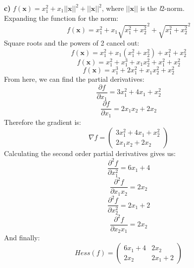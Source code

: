 \documentclass{article}
\begin{document}
\textbf{c)} $f(\boldsymbol{x}) = x_1^2 + x_1||\boldsymbol{x}||^2 + ||\boldsymbol{x}||^2$, where $||\boldsymbol{x}||$ is the \textit{l}2-norm.\\
Expanding the function for the norm:
\begin{equation*}
    f(\boldsymbol{x}) = x_1^2 + x_1 \sqrt{x_1^2 + x_2^2}^2 + \sqrt{x_1^2 + x_2^2}^2
\end{equation*}
Square roots and the powers of 2 cancel out:
\begin{equation*}
    f(\boldsymbol{x}) = x_1^2 + x_1(x_1^2 + x_2^2) + x_1^2 + x_2^2
\end{equation*}
\begin{equation*}
    f(\boldsymbol{x}) = x_1^2 + x_1^3 + x_1x_2^2 + x_1^2 + x_2^2
\end{equation*}
\begin{equation*}
    f(\boldsymbol{x}) = x_1^3 + 2x_1^2 + x_1x_2^2 + x_2^2
\end{equation*}
From here, we can find the partial derivatives:
\begin{equation*}
    \frac{\partial f}{\partial x_1} = 3x_1^2 + 4x_1 + x_2^2
\end{equation*}
\begin{equation*}
    \frac{\partial f}{\partial x_1} = 2x_1x_2 + 2x_2
\end{equation*}
Therefore the gradient is:
\begin{equation*}
    \nabla f = \begin{pmatrix} 3x_1^2 + 4x_1 + x_2^2\\ 2x_1x_2 + 2x_2\end{pmatrix}
\end{equation*}
Calculating the second order partial derivatives gives us:
\begin{equation*}
    \frac{\partial ^2 f}{\partial x_1^2} = 6x_1 + 4
\end{equation*}
\begin{equation*}
    \frac{\partial ^2 f}{\partial x_1x_2} = 2x_2
\end{equation*}
\begin{equation*}
    \frac{\partial ^2 f}{\partial x_2^2} = 2x_1 + 2
\end{equation*}
\begin{equation*}
    \frac{\partial ^2 f}{\partial x_2x_1} = 2x_2
\end{equation*}
And finally:
\begin{equation}
\label{1c_hess}
    Hess(f) = \begin{pmatrix} 6x_1 + 4 & 2x_2 \\ 2x_2 & 2x_1 + 2 \end{pmatrix}
\end{equation}
\end{document}
